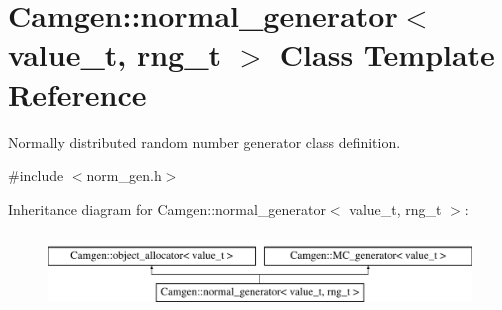 \hypertarget{a00385}{}\section{Camgen\+:\+:normal\+\_\+generator$<$ value\+\_\+t, rng\+\_\+t $>$ Class Template Reference}
\label{a00385}


Normally distributed random number generator class definition.  




{\ttfamily \#include $<$norm\+\_\+gen.\+h$>$}

Inheritance diagram for Camgen\+:\+:normal\+\_\+generator$<$ value\+\_\+t, rng\+\_\+t $>$\+:\begin{figure}[H]
\begin{center}
\leavevmode
\includegraphics[height=2.000000cm]{a00385}
\end{center}
\end{figure}
